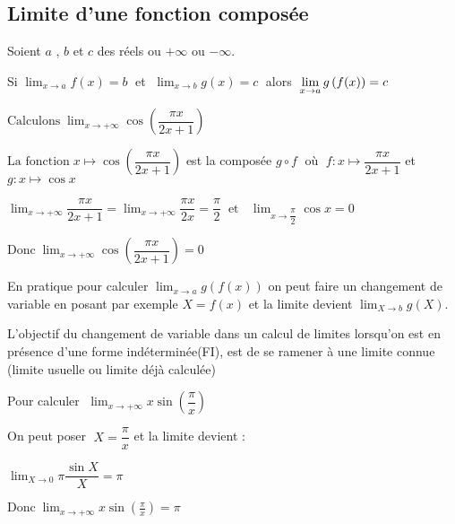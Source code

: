 
\everymath{\displaystyle}

 \summary{}
     
    \subsection{Limite d'une fonction composée}
      Soient $a$ , $b$
        et  $c$ des réels ou  $+\infty $ ou $-\infty $.
        
   \medskip
\begin{property}
Si  $ \displaystyle\lim_{x \to a}f(x)=b \;$ et $\;   \displaystyle\lim_{x \to b}g(x)=c \;$ alors $ \;   \displaystyle\lim_{x \to a}g\left(f(x)\right)=c $
\end{property}

 \medskip
       \begin{example}
      $\text{Calculons}\; \displaystyle\lim_{x \to +\infty} \cos\left(\dfrac{\pi x}{2x+1}\right)$
      
       $ \text{La fonction} \; x \mapsto \cos\left(\dfrac{\pi x}{2x+1}\right)$ est la composée $ g\circ f\; $  où $\; f: x\mapsto\dfrac{\pi x}{2x+1}$  et $g: x \mapsto \cos x $
       
        $\displaystyle\lim_{x \to +\infty} \dfrac{\pi x}{2x+1}= \displaystyle\lim_{x \to +\infty} \dfrac{\pi x}{2x }=\dfrac{\pi }{2} \;\; \text{et }\;\; \displaystyle\lim_{x \to \dfrac{\pi }{2}} \cos x=0$
        
      $\text{Donc}\; \displaystyle\lim_{x \to +\infty} \cos\left(\dfrac{\pi x}{2x+1}\right)=0$
   \end{example}
     \begin{remark}
       En pratique pour calculer $\displaystyle\lim_{x \to a}g\left(f(x)\right) $ on peut faire  un changement de variable en posant par exemple   $X=f(x) $  et la limite devient  $\displaystyle\lim_{X \to b}g(X)$.
       
      L’objectif du changement de variable dans un calcul de limites lorsqu’on est en présence d’une forme indéterminée(FI), est de se ramener à une limite connue (limite usuelle ou limite déjà calculée)
     \end{remark}
\begin{example}
Pour calculer $\;\displaystyle \lim_{x \to +\infty} x\sin \left(\dfrac{\pi}{x}\right)$
 
     On peut poser $ \; X=\dfrac{\pi }{x}$  et la limite devient :
      
      $\displaystyle\lim_{X\to 0} \pi\dfrac{\sin X }{X}=\pi $
      
       $\text{Donc}\; \displaystyle\lim_{x \to +\infty} x\sin \left(\frac{\pi}{x}\right)=\pi$
   \end{example}
